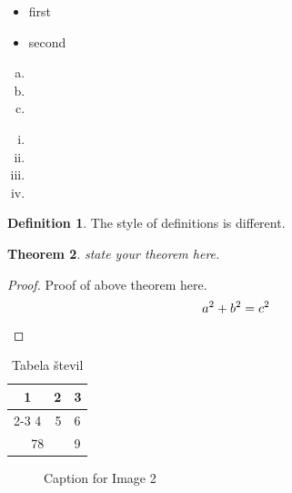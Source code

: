 \documentclass[11pt,a4paper]{article}
\theoremstyle{plain}
\newtheorem{theorem}{Theorem}[section]
\theoremstyle{definition}
\newtheorem{definition}[theorem]{Definition}
\theoremstyle{plain}
\theoremstyle{definition}
\begin{document}
\begin{itemize}
	\item first
	\item second
\end{itemize}

\begin{enumerate}[(a)]
	\item 
	\item 
	\item
\end{enumerate}

\begin{enumerate}[(i)]
	\item 
	\item 
	\item
	\item
\end{enumerate}

\begin{definition}
	The style of definitions is different.
\end{definition}

\begin{theorem}\label{thm:first}
	state your theorem here.
\end{theorem}

\begin{proof}
	Proof of above theorem here.
	\begin{equation*}
		a^2+b^2=c^2       \qedhere
	\end{equation*}
\end{proof}

\begin{table}
\begin{center}
\begin{tabular}{|c|r|l|}
	\hline
	1 & 2 & 3 \\
	\cline{2-3}
	4 & 5 & 6\\
	\hline \hline
	\multicolumn{2}{|c|}{78} & 9\\
	\hline
\end{tabular}	
\end{center}
\caption{Tabela števil}
\label{tab:st}
\end{table}

\begin{figure}[h]
	\centering
	\begin{minipage}{0.45\textwidth}
		\centering
		\caption{Caption for Image 1}
	\end{minipage}
	\hfill %
	\begin{minipage}{0.45\textwidth}
		\centering
		\caption{Caption for Image 2}
	\end{minipage}
\end{figure}
\end{document}
